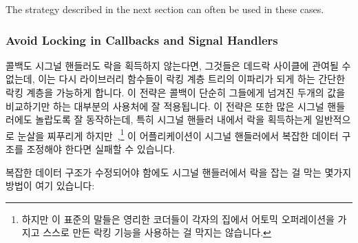 The strategy described in the next section can often be used in these cases.

\fi

\subsubsection{Avoid Locking in Callbacks and Signal Handlers}
\label{sec:locking:Avoid Locking in Callbacks and Signal Handlers}

콜백도 시그널 핸들러도 락을 획득하지 않는다면, 그것들은 데드락 사이클에 관여될
수 없는데, 이는 다시 라이브러리 함수들이 락킹 계층 트리의 이파리가 되게 하는
간단한 락킹 계층을 가능하게 합니다.
이 전략은 콜백이 단순히 그들에게 넘겨진 두개의 값을 비교하기만 하는 대부분의
 사용처에 잘 적용됩니다.
이 전략은 또한 많은 시그널 핸들러에도 놀랍도록 잘 동작하는데, 특히 시그널
핸들러 내에서 락을 획득하는게 일반적으로 눈살을 찌푸리게
하지만~\cite{TheOpenGroup1997SUS},\footnote{
	하지만 이 표준의 말들은 영리한 코더들이 각자의 집에서 어토믹
	오퍼레이션을 가지고 스스로 만든 락킹 기능을 사용하는 걸 막지는
	않습니다.}
이 어플리케이션이 시그널 핸들러에서 복잡한 데이터 구조를 조정해야 한다면 실패할
수 있습니다.

복잡한 데이터 구조가 수정되어야 함에도 시그널 핸들러에서 락을 잡는 걸 막는
몇가지 방법이 여기 있습니다:

